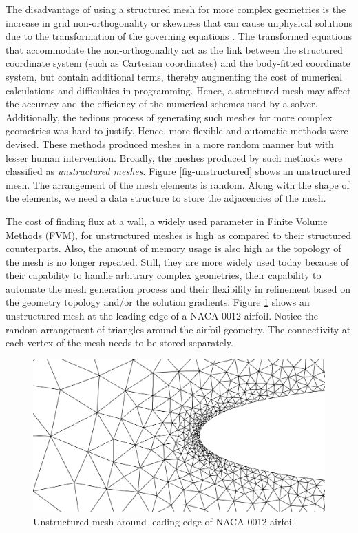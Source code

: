 The disadvantage of using a structured mesh for more complex geometries is the increase in grid non-orthogonality or skewness that can cause unphysical solutions due to the transformation of the governing equations \cite{TU2013219}. The transformed equations that accommodate the non-orthogonality act as the link between the structured coordinate system (such as Cartesian coordinates) and the body-fitted coordinate system, but contain additional terms, thereby augmenting the cost of numerical calculations and difficulties in programming. Hence, a structured mesh may affect the accuracy and the efficiency of the numerical schemes used by a solver. Additionally, the tedious process of generating such meshes for more complex geometries was hard to justify. Hence, more flexible and automatic methods were devised. These methods produced meshes in a more random manner but with lesser human intervention. Broadly, the meshes produced by such methods were classified as \textit{unstructured meshes}. Figure \ref{fig-unstructured} shows an unstructured mesh. The arrangement of the mesh elements is random. Along with the shape of the elements, we need a data structure to store the adjacencies of the mesh.

The cost of finding flux at a wall, a widely used parameter in Finite Volume Methods (FVM), for unstructured meshes is high as compared to their structured counterparts. Also, the amount of memory usage is also high as the topology of the mesh is no longer repeated. Still, they are more widely used today because of their capability to handle arbitrary complex geometries, their capability to automate the mesh generation process and their flexibility in refinement based on the geometry topology and/or the solution gradients. Figure \ref{fig-unstructuredNaca0012} shows an unstructured mesh at the leading edge of a NACA 0012 airfoil. Notice the random arrangement of triangles around the airfoil geometry. The connectivity at each vertex of the mesh needs to be stored separately.

\begin{figure}
  \centering
  \includegraphics[width=0.8\linewidth]{img/intro/unstructuredNaca0012.png}
  \caption{Unstructured mesh around leading edge of NACA 0012 airfoil}
  \label{fig-unstructuredNaca0012}
\end{figure}

